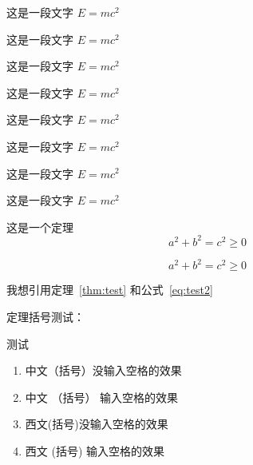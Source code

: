 \begin{corollary}
  这是一段文字 $E = m c^2$
\end{corollary}

\begin{lemma}
  这是一段文字 $E = m c^2$
\end{lemma}

\begin{axiom}
  这是一段文字 $E = m c^2$
\end{axiom}

\begin{counterexample}
  这是一段文字 $E = m c^2$
\end{counterexample}

\begin{conjecture}
  这是一段文字 $E = m c^2$
\end{conjecture}

\begin{question}
  这是一段文字 $E = m c^2$
\end{question}

\begin{claim}
  这是一段文字 $E = m c^2$
\end{claim}

\begin{remark}
  这是一段文字 $E = m c^2$
\end{remark}

\begin{theorem}[Cauchy]\label{thm:test}
  这是一个定理
  \begin{equation}\label{eq:test1}
    a^2 + b^2 = c^2 \geq 0
  \end{equation}

  \begin{equation}\label{eq:test2}
    a^2 + b^2 = c^2 \geq 0
  \end{equation}
\end{theorem}

我想引用定理~\ref{thm:test} 和公式~\ref{eq:test2}


定理括号测试：

\begin{theorem}
  测试
  \begin{enumerate}
    \item 中文（括号）没输入空格的效果
    \item 中文 （括号） 输入空格的效果
    \item 西文(括号)没输入空格的效果
    \item 西文 (括号) 输入空格的效果
  \end{enumerate}
\end{theorem} 


